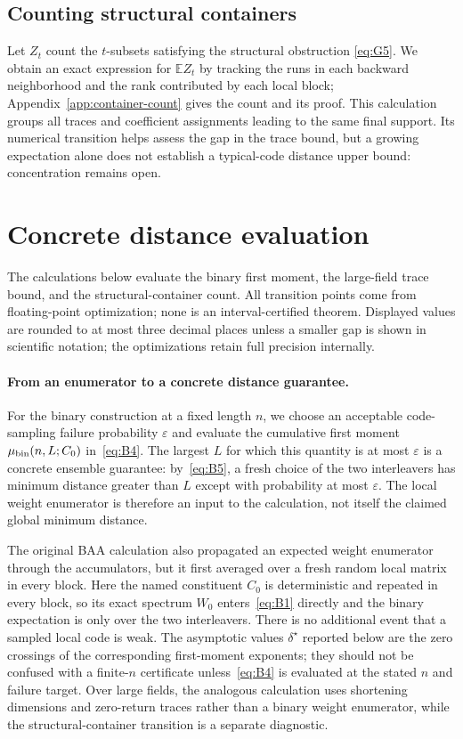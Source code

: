 \documentclass[runningheads,envcountsame,envcountsect]{llncs}
\newcommand{\E}{\mathbb E}
\begin{document}
\subsection{Counting structural containers}
Let $Z_t$ count the $t$-subsets satisfying the structural obstruction
\eqref{eq:G5}.  We obtain an exact expression for $\E Z_t$ by tracking the
runs in each backward neighborhood and the rank contributed by each local
block; Appendix~\ref{app:container-count} gives the count and its proof.
This calculation groups all traces and coefficient assignments leading to
the same final support.  Its numerical transition helps assess the gap in
the trace bound, but a growing expectation alone does not establish a
typical-code distance upper bound: concentration remains open.

\section{Concrete distance evaluation}
\label{sec:numerics}

The calculations below evaluate the binary first moment, the large-field trace
bound, and the structural-container count.  All transition points come from
floating-point optimization; none is an interval-certified theorem.  Displayed
values are rounded to at most three decimal places unless a smaller gap is shown
in scientific notation; the optimizations retain full precision internally.

\paragraph{From an enumerator to a concrete distance guarantee.}
For the binary construction at a fixed length $n$, we choose an acceptable
code-sampling failure probability $\varepsilon$ and evaluate the cumulative
first moment $\mu_{\rm bin}(n,L;C_0)$ in~\eqref{eq:B4}.  The largest $L$ for which this
quantity is at most $\varepsilon$ is a concrete ensemble guarantee: by~\eqref{eq:B5}, a
fresh choice of the two interleavers has minimum distance greater than $L$ except
with probability at most $\varepsilon$.  The local weight enumerator is therefore
an input to the calculation, not itself the claimed global minimum distance.

The original BAA calculation also propagated an expected weight enumerator
through the accumulators, but it first averaged over a fresh random local matrix
in every block.  Here the named constituent $C_0$ is deterministic and repeated
in every block, so its exact spectrum $W_0$ enters~\eqref{eq:B1} directly and the binary
expectation is only over the two interleavers.  There is no additional event that
a sampled local code is weak.  The asymptotic values $\delta^\star$ reported
below are the zero crossings of the corresponding first-moment exponents; they
should not be confused with a finite-$n$ certificate unless~\eqref{eq:B4} is evaluated at
the stated $n$ and failure target.  Over large fields, the analogous calculation
uses shortening dimensions and zero-return traces rather than a binary weight
enumerator, while the structural-container transition is a separate diagnostic.
\end{document}
